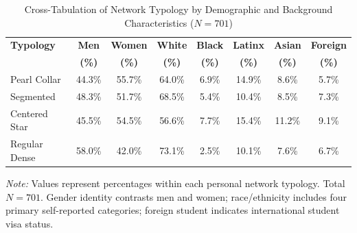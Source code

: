 \begin{table}[htbp]
\centering
\small
\setlength{\tabcolsep}{5pt}
\caption{Cross-Tabulation of Network Typology by Demographic and Background Characteristics ($N = 701$)}
\label{tab:demographics}
\begin{tabular}{lccccccc}
\toprule
\textbf{Typology} & \textbf{Men} & \textbf{Women} & \textbf{White} & \textbf{Black} & \textbf{Latinx} & \textbf{Asian} & \textbf{Foreign} \\
 & \textbf{(\%)} & \textbf{(\%)} & \textbf{(\%)} & \textbf{(\%)} & \textbf{(\%)} & \textbf{(\%)} & \textbf{(\%)} \\
\midrule
Pearl Collar  & 44.3\% & 55.7\% & 64.0\% & 6.9\% & 14.9\% & 8.6\%  & 5.7\% \\
Segmented     & 48.3\% & 51.7\% & 68.5\% & 5.4\% & 10.4\% & 8.5\%  & 7.3\% \\
Centered Star & 45.5\% & 54.5\% & 56.6\% & 7.7\% & 15.4\% & 11.2\% & 9.1\% \\
Regular Dense & 58.0\% & 42.0\% & 73.1\% & 2.5\% & 10.1\% & 7.6\%  & 6.7\% \\
\bottomrule
\end{tabular}
\vspace{1ex}
\parbox{\linewidth}{\footnotesize \textit{Note:} Values represent percentages within each personal network typology. Total $N = 701$. Gender identity contrasts men and women; race/ethnicity includes four primary self-reported categories; foreign student indicates international student visa status.}
\end{table}
